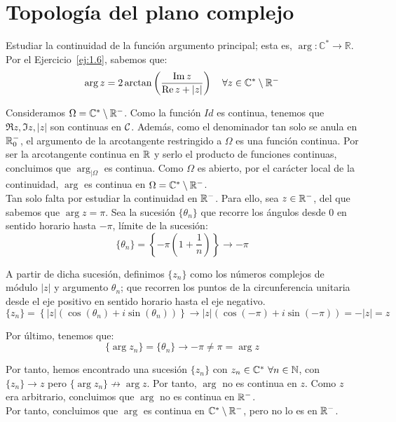 \section{Topología del plano complejo}

\begin{ejercicio}
    Estudiar la continuidad de la función argumento principal; esta es, $\arg : \mathbb{C}^\ast \to \mathbb{R}$.\\

    Por el Ejercicio~\ref{ej:1.6}, sabemos que:
    \begin{equation*}
        \arg z = 2\arctan\left(\frac{\operatorname{Im} z}{\operatorname{Re} z + |z|}\right) \quad \forall z \in \mathbb{C}^\ast\setminus \mathbb{R}^-
    \end{equation*}

    Consideramos $\Omega = \mathbb{C}^\ast\setminus \mathbb{R}^-$. Como la función $Id$ es continua, tenemos que $\Re z,\Im z, |z|$ son continuas en $\mathcal{C}$. Además, como el denominador tan solo se anula en $\mathbb{R}^-_0$, el argumento de la arcotangente restringido a $\Omega$ es una función continua. Por ser la arcotangente continua en $\mathbb{R}$ y serlo el producto de funciones continuas, concluimos que $\arg_{\big| \Omega}$ es continua. Como $\Omega$ es abierto, por el carácter local de la continuidad, $\arg$ es continua en $\Omega=\mathbb{C}^\ast\setminus \mathbb{R}^-$.\\

    Tan solo falta por estudiar la continuidad en $\mathbb{R}^-$. Para ello, sea $z\in \mathbb{R}^-$, del que sabemos que $\arg z = \pi$. Sea la sucesión $\{\theta_n\}$ que recorre los ángulos desde $0$ en sentido horario hasta $-\pi$, límite de la sucesión:
    \begin{equation*}
        \{\theta_n\} = \left\{-\pi\left(1+\frac{1}{n}\right)\right\}\to -\pi
    \end{equation*}

    A partir de dicha sucesión, definimos $\{z_n\}$ como los números complejos de módulo $|z|$ y argumento $\theta_n$; que recorren los puntos de la circunferencia unitaria desde el eje positivo en sentido horario hasta el eje negativo.
    \begin{equation*}
        \{z_n\} = \left\{|z|\left(\cos\left(\theta_n\right)+i\sin\left(\theta_n\right)\right)\right\}\to |z|\left(\cos(-\pi)+i\sin(-\pi)\right) = -|z| = z
    \end{equation*}

    Por último, tenemos que:
    \begin{equation*}
        \{\arg z_n\} = \{\theta_n\} \to -\pi\neq \pi = \arg z
    \end{equation*}

    Por tanto, hemos encontrado una sucesión $\{z_n\}$ con $z_n\in \mathbb{C}^*~\forall n\in \mathbb{N}$, con $\{z_n\}\to z$ pero $\{\arg z_n\}\nrightarrow \arg z$. Por tanto, $\arg$ no es continua en $z$. Como $z$ era arbitrario, concluimos que $\arg$ no es continua en $\mathbb{R}^-$.\\

    Por tanto, concluimos que $\arg$ es continua en $\mathbb{C}^\ast\setminus \mathbb{R}^-$, pero no lo es en $\mathbb{R}^-$.
\end{ejercicio}

